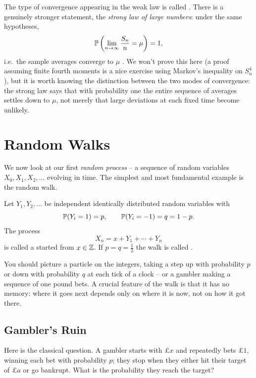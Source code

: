 \documentclass[a4paper]{scrartcl}
\begin{document}
\begin{remark}
	The type of convergence appearing in the weak law is called . There is a genuinely stronger statement, the \emph{strong law of large numbers}: under the same hypotheses,
	$$
	\mathbb{P}\left(\lim_{n \to \infty} \frac{S_n}{n} = \mu\right) = 1,
	$$
	i.e.\ the sample averages converge to $\mu$ . We won't prove this here (a proof assuming finite fourth moments is a nice exercise using Markov's inequality on $S_n^4$), but it is worth knowing the distinction between the two modes of convergence: the strong law says that with probability one the entire sequence of averages settles down to $\mu$, not merely that large deviations at each fixed time become unlikely.
\end{remark}


\section{Random Walks}

We now look at our first \emph{random process} -- a sequence of random variables $X_0, X_1, X_2, \dots$ evolving in time. The simplest and most fundamental example is the random walk.

\begin{definition}
	Let $Y_1, Y_2, \dots$ be independent identically distributed random variables with
	$$
	\mathbb{P}(Y_i = 1) = p, \qquad \mathbb{P}(Y_i = -1) = q = 1 - p.
	$$
	The process
	$$
	X_n = x + Y_1 + \cdots + Y_n
	$$
	is called a  started from $x \in \mathbb{Z}$. If $p = q = \frac{1}{2}$ the walk is called .
\end{definition}

You should picture a particle on the integers, taking a step up with probability $p$ or down with probability $q$ at each tick of a clock -- or a gambler making a sequence of one pound bets. A crucial feature of the walk is that it has no memory: where it goes next depends only on where it is now, not on how it got there.

\subsection{Gambler's Ruin}

Here is the classical question. A gambler starts with $\pounds x$ and repeatedly bets $\pounds 1$, winning each bet with probability $p$; they stop when they either hit their target of $\pounds a$ or go bankrupt. What is the probability they reach the target?
\end{document}
